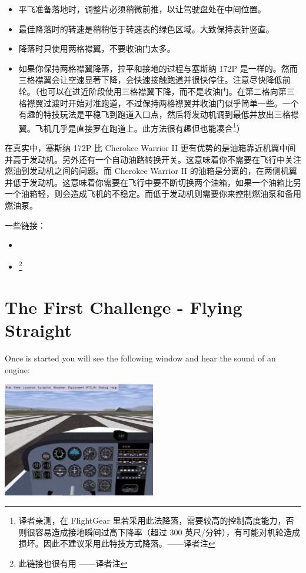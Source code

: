 \begin{itemize}
\begin{itemize}
    \item 平飞准备落地时，调整片必须稍微前推，以让驾驶盘处在中间位置。
    \item 最佳降落时的转速是稍稍低于转速表的绿色区域。大致保持表针竖直。
    \item 降落时只使用两格襟翼，不要收油门太多。
    \item 如果你保持两格襟翼降落，拉平和接地的过程与塞斯纳 172P 是一样的。然而三格襟翼会让空速显著下降，会快速接触跑道并很快停住。注意尽快降低前轮。（也可以在进近阶段使用三格襟翼下降，而不是收油门。在第二格向第三格襟翼过渡时开始对准跑道，不过保持两格襟翼并收油门似乎简单一些。一个有趣的特技玩法是平稳飞到跑道入口点，然后将发动机调到最低并放出三格襟翼。飞机几乎是直接罗在跑道上。此方法很有趣但也能凑合\footnote{译者亲测，在 FlightGear 里若采用此法降落，需要较高的控制高度能力，否则很容易造成接地瞬间过高下降率（超过 300 英尺/分钟），有可能对机轮造成损坏。因此不建议采用此特技方式降落。——译者注}）
\end{itemize}

在真实中，塞斯纳 172P 比 Cherokee Warrior II 更有优势的是油箱靠近机翼中间并高于发动机。另外还有一个自动油路转换开关。这意味着你不需要在飞行中关注燃油到发动机之间的问题。而 Cherokee Warrior II 的油箱是分离的，在两侧机翼并低于发动机。这意味着你需要在飞行中要不断切换两个油箱，如果一个油箱比另一个油箱轻，则会造成飞机的不稳定。而低于发动机则需要你来控制燃油泵和备用燃油泵。

一些链接：
\begin{itemize}
    \item {}
    \item {} \footnote{此链接也很有用  ——译者注}
\end{itemize}




\iffalse
\section{The First Challenge - Flying Straight}
\label{sec:FlyingStraight}

Once \FlightGear{} is started you will see the following window and hear the
sound of an engine:

\begin{center}
\includegraphics[width=0.5\textwidth]{img/tut_6}
\end{center}


\end{itemize}
